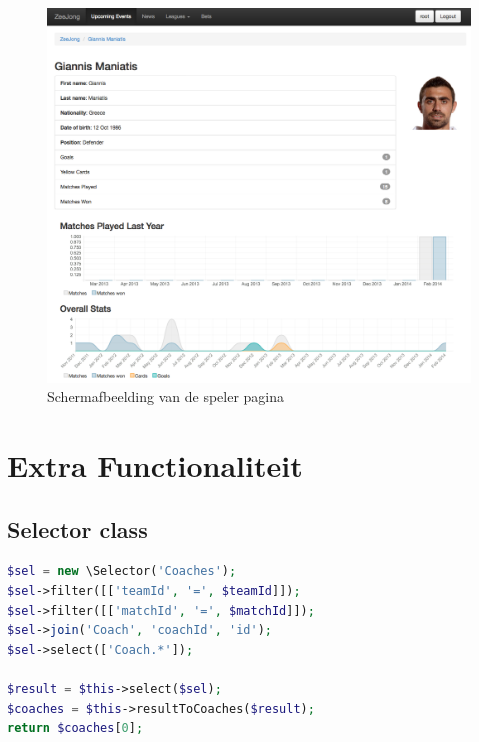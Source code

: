 \documentclass[11pt]{article}
\begin{document}
\begin{figure}[h!]
	\begin{center}
	\includegraphics[scale=0.29]{player.png}

	\caption{Schermafbeelding van de speler pagina}
	\label{fig:speler}
	\end{center}
\end{figure}




\section{Extra Functionaliteit}


\subsection{Selector class}



\begin{framed}
\begin{lstlisting}[language=php]
$sel = new \Selector('Coaches');
$sel->filter([['teamId', '=', $teamId]]);
$sel->filter([['matchId', '=', $matchId]]);
$sel->join('Coach', 'coachId', 'id');
$sel->select(['Coach.*']);

$result = $this->select($sel);
$coaches = $this->resultToCoaches($result);
return $coaches[0];
\end{lstlisting}
\end{framed}
\end{document}

